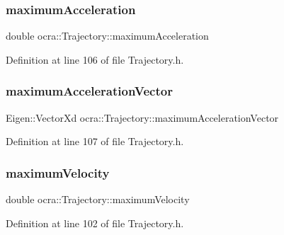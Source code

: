 \subsubsection{\texorpdfstring{maximum\+Acceleration}{maximumAcceleration}}
{\footnotesize\ttfamily double ocra\+::\+Trajectory\+::maximum\+Acceleration\hspace{0.3cm}{\ttfamily [protected]}}



Definition at line 106 of file Trajectory.\+h.

\hypertarget{classocra_1_1Trajectory_a86d9d30e890716e117ab2d3b4b328f3d}{}\label{classocra_1_1Trajectory_a86d9d30e890716e117ab2d3b4b328f3d} 
\subsubsection{\texorpdfstring{maximum\+Acceleration\+Vector}{maximumAccelerationVector}}
{\footnotesize\ttfamily Eigen\+::\+Vector\+Xd ocra\+::\+Trajectory\+::maximum\+Acceleration\+Vector\hspace{0.3cm}{\ttfamily [protected]}}



Definition at line 107 of file Trajectory.\+h.

\hypertarget{classocra_1_1Trajectory_ad79f3742bec59a80c3d641ccdc08012d}{}\label{classocra_1_1Trajectory_ad79f3742bec59a80c3d641ccdc08012d} 
\subsubsection{\texorpdfstring{maximum\+Velocity}{maximumVelocity}}
{\footnotesize\ttfamily double ocra\+::\+Trajectory\+::maximum\+Velocity\hspace{0.3cm}{\ttfamily [protected]}}



Definition at line 102 of file Trajectory.\+h.

\hypertarget{classocra_1_1Trajectory_a206795c8d7e3bcb38b893d69fe0fa336}{}\label{classocra_1_1Trajectory_a206795c8d7e3bcb38b893d69fe0fa336} 
